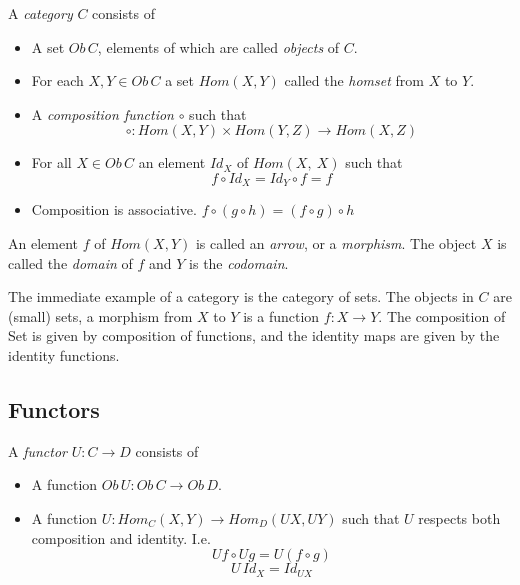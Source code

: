 \begin{definition}
    A \textit{category} $C$ consists of
    \begin{itemize}
        \item A set $Ob\,C$, elements of which are called \textit{objects} of $C$.
        \item For each $X, Y \in Ob\,C$
            a set $Hom(X,Y)$ called the \textit{homset} from $X$ to $Y$.
        \item A \textit{composition function} $\circ$ such that
            \begin{equation}
                \circ : Hom(X,Y) \times Hom(Y,Z) \rightarrow Hom(X,Z)
            \end{equation}
        \item For all $X \in Ob\,C$ an element $Id_X$ of $Hom(X,\ X)$ such that
            \begin{equation}
            f \circ Id_X = Id_Y \circ f = f
            \end{equation}
        \item Composition is associative.  $f \circ (g \circ h) = (f \circ g) \circ h$
    \end{itemize}
\end{definition}

\par
An element $f$ of $Hom(X,Y)$ is called an \textit{arrow},
or a \textit{morphism}. The object $X$ is called the \textit{domain} of $f$ and $Y$ is
the \textit{codomain}.\\

\begin{example}
    The immediate example of a category is the category of sets.
    The objects in $C$ are (small) sets,
    a morphism from $X$ to $Y$ is a function $f : X \rightarrow Y$.
    The composition of Set is given by composition of functions,
    and the identity maps are given by the identity functions.
\end{example}

\subsection{Functors}
\begin{definition}
    A \textit{functor} $U : C \rightarrow D$ consists of
    \begin{itemize}
        \item A function $Ob\,U : Ob\,C \rightarrow Ob\,D$.
        \item A function $U : Hom_C(X,Y) \rightarrow Hom_D(UX, UY)$
            such that $U$ respects both composition and identity.
            I.e.
            \begin{equation}
                Uf \circ Ug = U(f \circ g)
            \end{equation}
            \begin{equation}
                U\,Id_X = Id_{UX}
            \end{equation}
    \end{itemize}
\end{definition}

